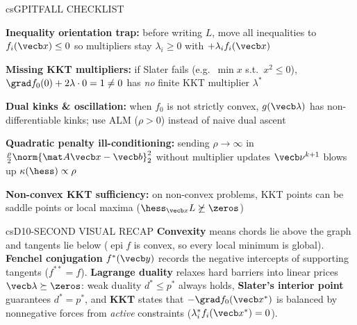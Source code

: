 \documentclass[../../../../master.tex]{subfiles}
\begin{document}
\begin{cscolumns}
\begin{cscard}{csG}{PITFALL CHECKLIST}
  \begin{csbul}
    \item \textbf{Inequality orientation trap:} before writing $L$, move all inequalities to $f_i(\vecb x)\le 0$ so multipliers stay $\lambda_i\ge 0$ with $+\lambda_i f_i(\vecb x)$
    \item \textbf{Missing KKT multipliers:} if Slater fails (e.g.\ $\min x$ s.t.\ $x^2\le 0$), $\grad f_0(0)+2\lambda\cdot 0=1\neq 0$ has \emph{no} finite KKT multiplier $\lambda^*$
    \item \textbf{Dual kinks \& oscillation:} when $f_0$ is not strictly convex, $g(\vecb\lambda)$ has non-differentiable kinks; use ALM ($\rho>0$) instead of naive dual ascent
    \item \textbf{Quadratic penalty ill-conditioning:} sending $\rho\to\infty$ in $\frac{\rho}{2}\norm{\mat A\vecb x-\vecb b}_2^2$ without multiplier updates $\vecb\nu^{k+1}$ blows up $\kappa(\hess)\propto\rho$
    \item \textbf{Non-convex KKT sufficiency:} on non-convex problems, KKT points can be saddle points or local maxima ($\hess_{\vecb x}L\not\succeq\zeros$)
  \end{csbul}
\end{cscard}

\begin{cscard}{csD}{10-SECOND VISUAL RECAP}
  \sffamily\footnotesize
  \textbf{Convexity} means chords lie above the graph and tangents lie below ($\operatorname{epi}f$ is convex, so every local minimum is global).
  \textbf{Fenchel conjugation} $f^*(\vecb y)$ records the negative intercepts of supporting tangents ($f^{**}=f$).
  \textbf{Lagrange duality} relaxes hard barriers into linear prices $\vecb\lambda\succeq\zeros$: weak duality $d^*\le p^*$ always holds, \textbf{Slater's interior point} guarantees $d^*=p^*$, and \textbf{KKT} states that $-\grad f_0(\vecb x^*)$ is balanced by nonnegative forces from \emph{active} constraints ($\lambda_i^* f_i(\vecb x^*)=0$).
\end{cscard}
\end{cscolumns}

\csend
\end{document}
